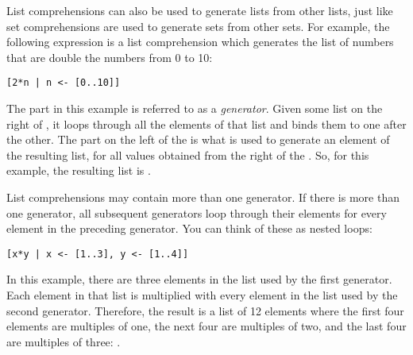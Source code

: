 \taskLine

List comprehensions can also be used to generate lists from other lists, just like set comprehensions are used to generate sets from other sets. For example, the following expression is a list comprehension which generates the list of numbers that are double the numbers from 0 to 10:
\begin{verbatim}
[2*n | n <- [0..10]]
\end{verbatim}
The  part in this example is referred to as a \emph{generator}. Given some list on the right of \haskellIn{<-}, it loops through all the elements of that list and binds them to  one after the other. The part on the left of the \haskellIn{|} is what is used to generate an element of the resulting list, for all values obtained from the right of the \haskellIn{|}. So, for this example, the resulting list is \haskellIn{[0,2,4,6,8,10,12,14,16,18,20]}.

\taskLine


\taskLine


\taskLine

List comprehensions may contain more than one generator. If there is more than one generator, all subsequent generators loop through their elements for every element in the preceding generator. You can think of these as nested loops:
\begin{verbatim}
[x*y | x <- [1..3], y <- [1..4]]
\end{verbatim}
In this example, there are three elements in the list used by the first generator. Each element in that list is multiplied with every element in the list used by the second generator. Therefore, the result is a list of 12 elements where the first four elements are multiples of one, the next four are multiples of two, and the last four are multiples of three: \haskellIn{[1,2,3,4,2,4,6,8,3,6,9,12]}.

\taskLine


